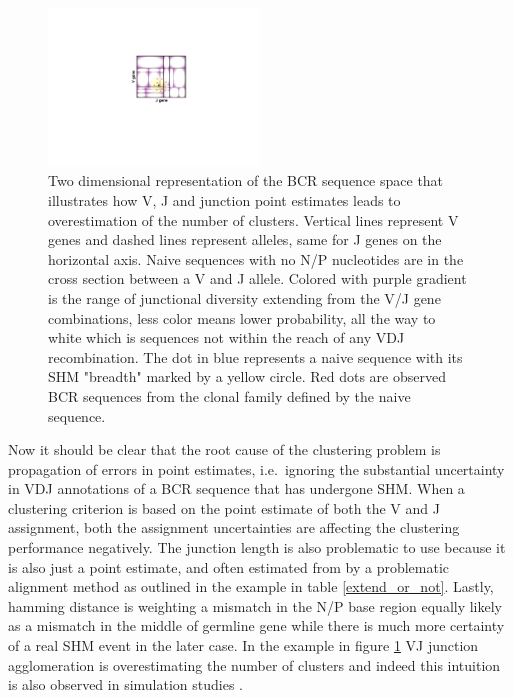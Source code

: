 \begin{figure}[ht]
    \centering
    \includegraphics[width=0.5\textwidth]{figures/VJ_CDR3_agglomeration.pdf}
    \caption{
        \label{fig:VJ_CDR3_agglomeration}
        Two dimensional representation of the BCR sequence space that illustrates how V, J and junction point estimates leads to overestimation of the number of clusters.
        Vertical lines represent V genes and dashed lines represent alleles, same for J genes on the horizontal axis.
        Naive sequences with no N/P nucleotides are in the cross section between a V and J allele.
        Colored with purple gradient is the range of junctional diversity extending from the V/J gene combinations, less color means lower probability, all the way to white which is sequences not within the reach of any VDJ recombination.
        The dot in blue represents a naive sequence with its SHM "breadth" marked by a yellow circle.
        Red dots are observed BCR sequences from the clonal family defined by the naive sequence.
    }
\end{figure}


Now it should be clear that the root cause of the clustering problem is propagation of errors in point estimates, i.e.\ ignoring the substantial uncertainty in VDJ annotations of a BCR sequence that has undergone SHM.
When a clustering criterion is based on the point estimate of both the V and J assignment, both the assignment uncertainties are affecting the clustering performance negatively.
The junction length is also problematic to use because it is also just a point estimate, and often estimated from by a problematic alignment method as outlined in the example in table \ref{extend_or_not}.
Lastly, hamming distance is weighting a mismatch in the N/P base region equally likely as a mismatch in the middle of germline gene while there is much more certainty of a real SHM event in the later case.
In the example in figure \ref{fig:VJ_CDR3_agglomeration} VJ junction agglomeration is overestimating the number of clusters and indeed this intuition is also observed in simulation studies \cite{ralph2016likelihood}.

